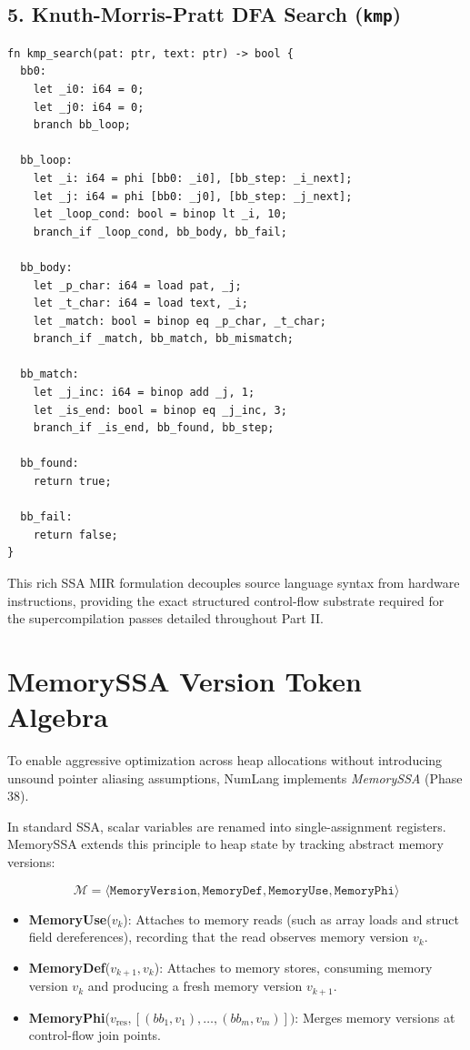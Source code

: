 \subsection{5. Knuth-Morris-Pratt DFA Search (\texttt{kmp})}
\begin{lstlisting}[caption={SSA MIR for \texttt{kmp}.}]
fn kmp_search(pat: ptr, text: ptr) -> bool {
  bb0:
    let _i0: i64 = 0;
    let _j0: i64 = 0;
    branch bb_loop;

  bb_loop:
    let _i: i64 = phi [bb0: _i0], [bb_step: _i_next];
    let _j: i64 = phi [bb0: _j0], [bb_step: _j_next];
    let _loop_cond: bool = binop lt _i, 10;
    branch_if _loop_cond, bb_body, bb_fail;

  bb_body:
    let _p_char: i64 = load pat, _j;
    let _t_char: i64 = load text, _i;
    let _match: bool = binop eq _p_char, _t_char;
    branch_if _match, bb_match, bb_mismatch;

  bb_match:
    let _j_inc: i64 = binop add _j, 1;
    let _is_end: bool = binop eq _j_inc, 3;
    branch_if _is_end, bb_found, bb_step;

  bb_found:
    return true;

  bb_fail:
    return false;
}
\end{lstlisting}

This rich SSA MIR formulation decouples source language syntax from hardware instructions, providing the exact structured control-flow substrate required for the supercompilation passes detailed throughout Part II.

\section{MemorySSA Version Token Algebra}
\label{sec:ir:memory_ssa}

To enable aggressive optimization across heap allocations without introducing unsound pointer aliasing assumptions, NumLang implements \emph{MemorySSA} (Phase 38).

In standard SSA, scalar variables are renamed into single-assignment registers. MemorySSA extends this principle to heap state by tracking abstract memory versions:

\begin{equation}
\mathcal{M} = \langle \mathtt{MemoryVersion}, \mathtt{MemoryDef}, \mathtt{MemoryUse}, \mathtt{MemoryPhi} \rangle
\end{equation}

\begin{itemize}
    \item \textbf{MemoryUse}($v_k$): Attaches to memory reads (such as array loads and struct field dereferences), recording that the read observes memory version $v_k$.
    \item \textbf{MemoryDef}($v_{k+1}, v_k$): Attaches to memory stores, consuming memory version $v_k$ and producing a fresh memory version $v_{k+1}$.
    \item \textbf{MemoryPhi}($v_{\text{res}}, [(bb_1, v_1), \dots, (bb_m, v_m)])$: Merges memory versions at control-flow join points.
\end{itemize}

